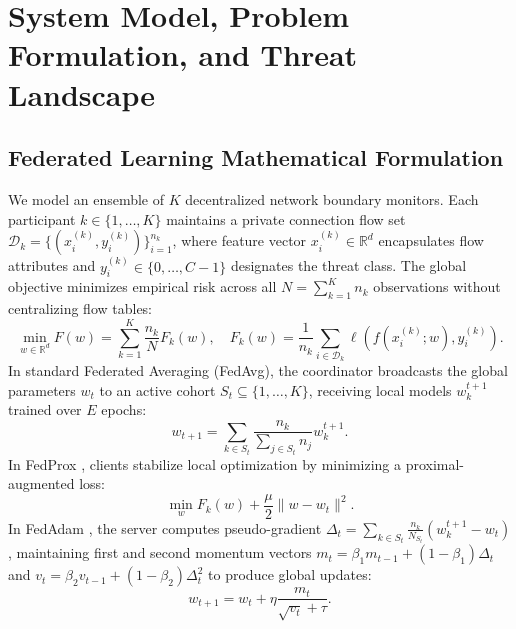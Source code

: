 \documentclass[runningheads]{llncs}
\begin{document}
\section{System Model, Problem Formulation, and Threat Landscape}
\label{sec:system_model}

\subsection{Federated Learning Mathematical Formulation}
We model an ensemble of $K$ decentralized network boundary monitors. Each participant $k \in \{1, \dots, K\}$ maintains a private connection flow set $\mathcal{D}_k = \{(x_i^{(k)}, y_i^{(k)})\}_{i=1}^{n_k}$, where feature vector $x_i^{(k)} \in \mathbb{R}^d$ encapsulates flow attributes and $y_i^{(k)} \in \{0, \dots, C-1\}$ designates the threat class. The global objective minimizes empirical risk across all $N = \sum_{k=1}^K n_k$ observations without centralizing flow tables:
\begin{equation}
\min_{w \in \mathbb{R}^d} F(w) = \sum_{k=1}^K \frac{n_k}{N} F_k(w), \quad F_k(w) = \frac{1}{n_k} \sum_{i \in \mathcal{D}_k} \ell(f(x_i^{(k)}; w), y_i^{(k)}).
\end{equation}
In standard Federated Averaging (FedAvg), the coordinator broadcasts the global parameters $w_t$ to an active cohort $S_t \subseteq \{1, \dots, K\}$, receiving local models $w_k^{t+1}$ trained over $E$ epochs:
\begin{equation}
w_{t+1} = \sum_{k \in S_t} \frac{n_k}{\sum_{j \in S_t} n_j} w_k^{t+1}.
\end{equation}
In FedProx \cite{li2020federated}, clients stabilize local optimization by minimizing a proximal-augmented loss:
\begin{equation}
\min_{w} F_k(w) + \frac{\mu}{2} \| w - w_t \|^2.
\end{equation}
In FedAdam \cite{reddi2020adaptive}, the server computes pseudo-gradient $\Delta_t = \sum_{k \in S_t} \frac{n_k}{N_{S_t}} (w_k^{t+1} - w_t)$, maintaining first and second momentum vectors $m_t = \beta_1 m_{t-1} + (1 - \beta_1) \Delta_t$ and $v_t = \beta_2 v_{t-1} + (1 - \beta_2) \Delta_t^2$ to produce global updates:
\begin{equation}
w_{t+1} = w_t + \eta \frac{m_t}{\sqrt{v_t} + \tau}.
\end{equation}
\end{document}
